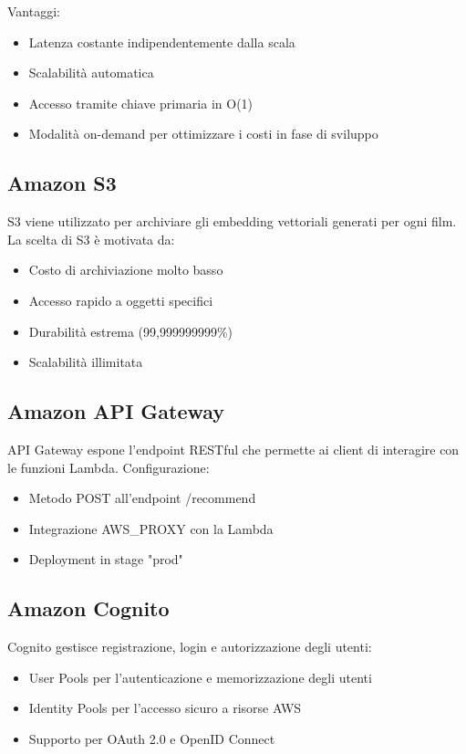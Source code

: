 \documentclass[11pt,a4paper]{article}
\begin{document}
Vantaggi:
\begin{itemize}
  \item Latenza costante indipendentemente dalla scala
  \item Scalabilità automatica
  \item Accesso tramite chiave primaria in O(1)
  \item Modalità on-demand per ottimizzare i costi in fase di sviluppo
\end{itemize}

\subsection{Amazon S3}
S3 viene utilizzato per archiviare gli embedding vettoriali generati per ogni film. La scelta di S3 è motivata da:

\begin{itemize}
  \item Costo di archiviazione molto basso
  \item Accesso rapido a oggetti specifici
  \item Durabilità estrema (99,999999999\%)
  \item Scalabilità illimitata
\end{itemize}

\subsection{Amazon API Gateway}
API Gateway espone l'endpoint RESTful che permette ai client di interagire con le funzioni Lambda. Configurazione:

\begin{itemize}
  \item Metodo POST all'endpoint /recommend
  \item Integrazione AWS\_PROXY con la Lambda
  \item Deployment in stage "prod"
\end{itemize}

\subsection{Amazon Cognito}
Cognito gestisce registrazione, login e autorizzazione degli utenti:

\begin{itemize}
  \item User Pools per l'autenticazione e memorizzazione degli utenti
  \item Identity Pools per l'accesso sicuro a risorse AWS
  \item Supporto per OAuth 2.0 e OpenID Connect
\end{itemize}
\end{document}
